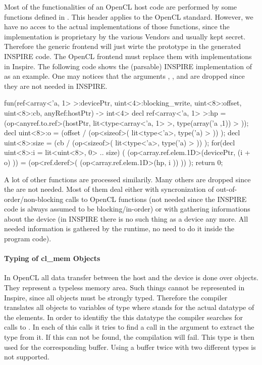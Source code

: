 Most of the functionalities of an OpenCL host code are performed by some
functions defined in . This header applies to the OpenCL standard.
However, we have no acces to the actual implementations of those functions,
since the implementation is proprietary by the various Vendors and usually kept
secret. Therefore the generic frontend will just wirte the prototype in the
generated INSPIRE code. The OpenCL frontend must replace them with
implementations in Inspire. The following code shows the (parsable) INSPIRE
implementation of  as an example. One may notices
that the arguments , , and  are dropped since they are not needed in INSPIRE. 
 
\label{lst:copyBuffer} 
\begin{irCode}
fun(ref<array<'a, 1> >:devicePtr, uint<4>:blocking_write, uint<8>:offset, uint<8>:cb, anyRef:hostPtr) -> int<4> {{ 
    decl ref<array<'a, 1> >:hp = (op<anyref.to.ref>(hostPtr, lit<type<array<'a, 1> >, type(array('a ,1)) > )); 
	decl uint<8>:o = (offset / (op<sizeof>( lit<type<'a>, type('a) > )) ); 
    decl uint<8>:size = (cb / (op<sizeof>( lit<type<'a>, type('a) > )) ); 
    for(decl uint<8>:i = lit<uint<8>, 0> .. size) 
        ( (op<array.ref.elem.1D>(devicePtr, (i + o) )) = (op<ref.deref>( (op<array.ref.elem.1D>(hp, i )) )) ); 
    return 0; 
}}
\end{irCode}

A lot of other functions are processed similarily. Many others are dropped since the are not needed. Most of them deal either with syncronization of out-of-order/non-blocking calls to OpenCL functions (not needed since the INSPIRE code is always assumed to be blocking/in-order) or with gathering informations about the device (in INSPIRE there is no such thing as a device any more. All needed information is gathered by the runtime, no need to do it inside the program code). 

\paragraph{Typing of cl\_mem Objects}

In OpenCL all data transfer between the host and the device is done over  objects. They represent a typeless memory area. Such things cannot be represented in Inspire, since all objects must be strongly typed. Therefore the compiler translates all  objects to variables of type  where  stands for the actual datatype of the elements. In order to identifiy the this datatype the compiler searches for calls to . In each of this calls it tries to find a  call in the  argument to extract the type from it. If this can not be found, the compilation will fail. This type is then used for the corresponding buffer. Using a buffer twice with two different types is not supported. 


